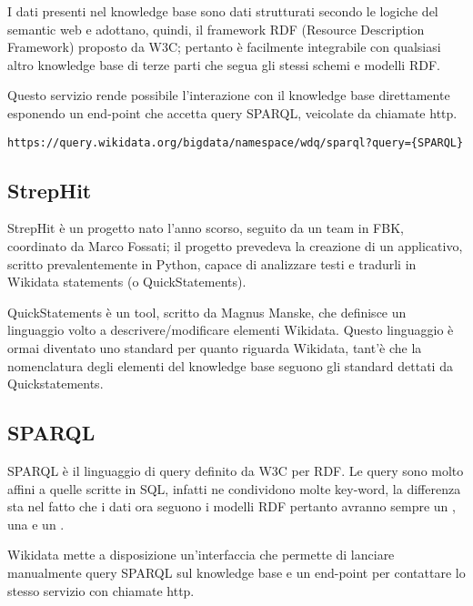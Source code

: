 I dati presenti nel knowledge base sono dati strutturati secondo le logiche del semantic web e adottano, quindi, il framework RDF (Resource Description Framework) proposto da W3C; 
pertanto è facilmente integrabile con qualsiasi altro knowledge base di terze parti che segua gli stessi schemi e modelli RDF.

Questo servizio rende possibile l'interazione con il knowledge base direttamente esponendo un end-point che accetta query SPARQL, veicolate da chiamate http. 

\begin{lstlisting}[style=YmlStyle, caption=SPARQL end-point]
    https://query.wikidata.org/bigdata/namespace/wdq/sparql?query={SPARQL}
\end{lstlisting}

\subsection{StrepHit}
StrepHit\cite{strephit} è un progetto nato l'anno scorso, seguito da un team in FBK, coordinato da Marco Fossati; il progetto prevedeva la creazione di un applicativo, scritto prevalentemente 
in Python, capace di analizzare testi e tradurli in Wikidata statements (o QuickStatements\cite{quickstatements}).  

QuickStatements è un tool, scritto da Magnus Manske, che definisce un linguaggio volto a descrivere/modificare elementi Wikidata. Questo linguaggio è ormai diventato uno standard 
per quanto riguarda Wikidata, tant'è che la nomenclatura degli elementi del knowledge base seguono gli standard dettati da Quickstatements.

\subsection{SPARQL}
SPARQL è il linguaggio di query definito da W3C per RDF. Le query sono molto affini a quelle scritte in SQL, infatti ne condividono molte key-word, la differenza sta nel fatto che i dati ora 
seguono i modelli RDF pertanto avranno sempre un , una  e un .

Wikidata mette a disposizione un'interfaccia\cite{sparql-ui} che permette di lanciare manualmente query SPARQL sul knowledge base
e un end-point\cite{sparql-end-point} per contattare lo stesso servizio con chiamate http. 
